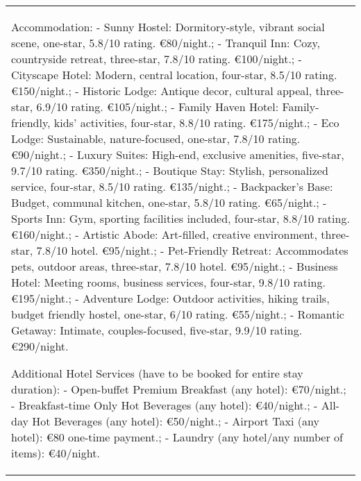\begin{table*}[!ht]
{\begin{tabular}{p{}}
Accommodation: 
\newline - Sunny Hostel: Dormitory-style, vibrant social scene, one-star, 5.8/10 rating. €80/night.;    \newline - Tranquil Inn: Cozy, countryside retreat, three-star, 7.8/10 rating. €100/night.;    \newline - Cityscape Hotel: Modern, central location, four-star, 8.5/10 rating. €150/night.;    \newline - Historic Lodge: Antique decor, cultural appeal, three-star, 6.9/10 rating. €105/night.;    \newline - Family Haven Hotel: Family-friendly, kids' activities, four-star, 8.8/10 rating. €175/night.;    \newline - Eco Lodge: Sustainable, nature-focused, one-star, 7.8/10 rating. €90/night.;    \newline - Luxury Suites: High-end, exclusive amenities, five-star, 9.7/10 rating. €350/night.;    \newline - Boutique Stay: Stylish, personalized service, four-star, 8.5/10 rating. €135/night.;    \newline - Backpacker’s Base: Budget, communal kitchen, one-star, 5.8/10 rating. €65/night.;    \newline - Sports Inn: Gym, sporting facilities included, four-star, 8.8/10 rating. €160/night.;    \newline - Artistic Abode: Art-filled, creative environment, three-star, 7.8/10 hotel. €95/night.;    \newline - Pet-Friendly Retreat: Accommodates pets, outdoor areas, three-star, 7.8/10 hotel. €95/night.;    \newline - Business Hotel: Meeting rooms, business services, four-star, 9.8/10 rating. €195/night.;    \newline - Adventure Lodge: Outdoor activities, hiking trails, budget friendly hostel, one-star, 6/10 rating. €55/night.;    \newline - Romantic Getaway: Intimate, couples-focused, five-star, 9.9/10 rating. €290/night. \newline 

Additional Hotel Services (have to be booked for entire stay duration):
\newline - Open-buffet Premium Breakfast (any hotel): €70/night.;    \newline - Breakfast-time Only Hot Beverages (any hotel): €40/night.;    \newline - All-day Hot Beverages (any hotel): €50/night.;    \newline - Airport Taxi (any hotel): €80 one-time payment.;    \newline - Laundry (any hotel/any number of items): €40/night.\newline 


\end{tabular}}
\end{table*}
